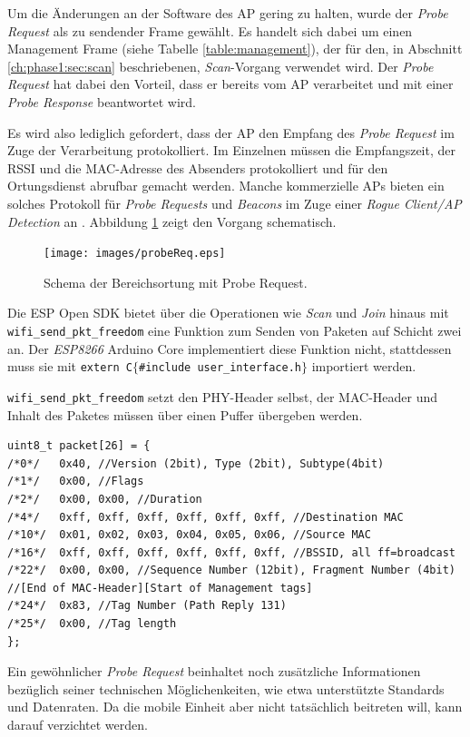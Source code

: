 Um die Änderungen an der Software des AP gering zu halten, wurde der \emph{Probe Request} als zu sendender Frame gewählt.
Es handelt sich dabei um einen Management Frame (siehe Tabelle \ref{table:management}), der für den, in Abschnitt \ref{ch:phase1:sec:scan} beschriebenen, \emph{Scan}-Vorgang verwendet wird.
Der \emph{Probe Request} hat dabei den Vorteil, dass er bereits vom AP verarbeitet und mit einer \emph{Probe Response} beantwortet wird. 

Es wird also lediglich gefordert, dass der AP den Empfang des \emph{Probe Request} im Zuge der Verarbeitung protokolliert. 
Im Einzelnen müssen die Empfangszeit, der RSSI und die MAC-Adresse des Absenders protokolliert und für den Ortungsdienst abrufbar gemacht werden. 
Manche kommerzielle APs bieten ein solches Protokoll für \emph{Probe Requests} und \emph{Beacons} im Zuge einer \textit{Rogue Client/AP Detection} an \cite{lancom2017rouge}.
Abbildung \ref{fig:probeReq} zeigt den Vorgang schematisch.

\begin{figure}[h]
  \centering
	\texttt{[image: images/probeReq.eps]}
  \caption{Schema der Bereichsortung mit Probe Request.}
  \label{fig:probeReq}
\end{figure}


Die ESP Open SDK bietet über die Operationen wie \emph{Scan} und \emph{Join} hinaus mit \texttt{wifi\_send\_pkt\_freedom} eine Funktion zum Senden von Paketen auf Schicht zwei an.
Der \emph{ESP8266} Arduino Core implementiert diese Funktion nicht, stattdessen muss sie mit \texttt{extern \dq C\dq $\lbrace$\#include \dq user\_interface.h\dq $\rbrace$} importiert werden. 

\texttt{wifi\_send\_pkt\_freedom} setzt den PHY-Header selbst, der MAC-Header und Inhalt des Paketes müssen über einen Puffer übergeben werden.
\begin{verbatim}
uint8_t packet[26] = { 
/*0*/ 	0x40, //Version (2bit), Type (2bit), Subtype(4bit)
/*1*/ 	0x00, //Flags 
/*2*/ 	0x00, 0x00, //Duration
/*4*/   0xff, 0xff, 0xff, 0xff, 0xff, 0xff, //Destination MAC
/*10*/  0x01, 0x02, 0x03, 0x04, 0x05, 0x06, //Source MAC
/*16*/  0xff, 0xff, 0xff, 0xff, 0xff, 0xff, //BSSID, all ff=broadcast
/*22*/  0x00, 0x00, //Sequence Number (12bit), Fragment Number (4bit) 
//[End of MAC-Header][Start of Management tags]
/*24*/  0x83, //Tag Number (Path Reply 131) 
/*25*/ 	0x00, //Tag length
}; 
\end{verbatim}
Ein gewöhnlicher \emph{Probe Request} beinhaltet noch zusätzliche Informationen bezüglich seiner technischen Möglichenkeiten, wie etwa unterstützte Standards und Datenraten. 
Da die mobile Einheit aber nicht tatsächlich beitreten will, kann darauf verzichtet werden. 

